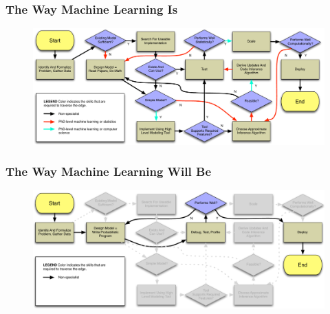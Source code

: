 \documentclass[usenames,dvipsnames]{beamer}
\begin{document}
\begin{frame}
  \frametitle{The Way Machine Learning Is}
  \begin{figure}[ht]
    \includegraphics[width=1\textwidth,keepaspectratio]{figures/ml_current.pdf}
    \caption*{\label{fig:ml-current}}
  \end{figure}
\end{frame}
\begin{frame}
  \frametitle{The Way Machine Learning Will Be }
  \begin{figure}[ht]
    \includegraphics[width=1\textwidth,keepaspectratio]{figures/ml_future.pdf}
    \caption*{\label{fig:ml-future}}
  \end{figure}
\end{frame}
\end{document}
